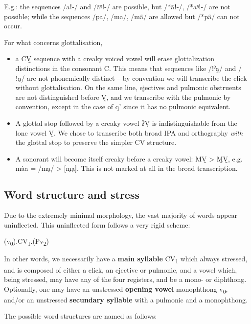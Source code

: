 \documentclass[11pt,a5paper]{book}
\newcommand{\qcn}[1]{\textcolor{AccentText}{\large#1}}
\begin{document}
E.g.: the sequences /aǃ-/ and /ãᵑǃ-/ are possible, but /*ãǃ-/, /*aᵑǃ-/ are not possible; while the sequences /pa/, /ma/, /mã/ are allowed but /*pã/ can not occur.

For what concerns glottalisation, 

\begin{itemize}
\item a CV̰ sequence with a creaky voiced vowel will erase glottalization distinctions in the consonant C. This means that sequences like /ǃˀa̰/ and /ǃa̰/ are not phonemically distinct -- by convention we will transcribe the click without glottalisation. On the same line, ejectives and pulmonic obstruents are not distinguished before V̰, and we transcribe with the pulmonic by convention, except in the case of \qcn{qʼ} since it has no pulmonic equivalent.
\item A glottal stop followed by a creaky vowel ʔV̰ is indistinguishable from the lone vowel V̰. We chose to transcribe both broad IPA and orthography \emph{with} the glottal stop to preserve the simpler CV structure.
\item A sonorant will become itself creaky before a creaky vowel: MV̰ > M̰V̰, e.g. \qcn{màa} = /ma̰/ > [m̰a̰]. This is not marked at all in the broad transcription.
\end{itemize}



\subsection{Word structure and stress}


Due to the extremely minimal morphology, the vast majority of words appear uninflected. This uninflected form follows a very rigid scheme:

\begin{center}
\LARGE (v\textsubscript{0}).\stress{}CV\textsubscript{1}.(Pv\textsubscript{2})
\end{center}

In other words, we necessarily have a \textbf{main syllable} CV\textsubscript{1} which always stressed, and is composed of either a click, an ejective or pulmonic, and a vowel which, being stressed, may have any of the four registers, and be a mono- or diphthong. Optionally, one may have an unstressed \textbf{opening vowel} monophthong v\textsubscript{0}, and/or an unstressed \textbf{secundary syllable} with a pulmonic and a monophthong.

The possible word structures are named as follows:
\end{document}
